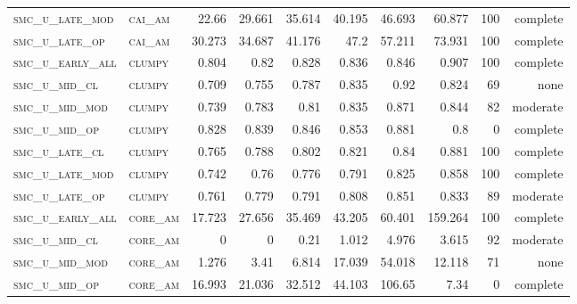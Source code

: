 \begin{landscape}
\begin{center}
\begin{footnotesize}
\begin{longtable}{llrrrrr|rrr}
\textsc{smc\_u\_late\_mod } & \textsc{cai\_am   }   & 22.66    & 29.661   & 35.614   & 40.195   & 46.693   & 60.877        & 100           & complete        \\
\textsc{smc\_u\_late\_op  } & \textsc{cai\_am   }   & 30.273   & 34.687   & 41.176   & 47.2     & 57.211   & 73.931        & 100           & complete        \\
\textsc{smc\_u\_early\_all} & \textsc{clumpy    }   & 0.804    & 0.82     & 0.828    & 0.836    & 0.846    & 0.907         & 100           & complete        \\
\textsc{smc\_u\_mid\_cl   } & \textsc{clumpy    }   & 0.709    & 0.755    & 0.787    & 0.835    & 0.92     & 0.824         & 69            & none        \\
\textsc{smc\_u\_mid\_mod  } & \textsc{clumpy    }   & 0.739    & 0.783    & 0.81     & 0.835    & 0.871    & 0.844         & 82            & moderate        \\
\textsc{smc\_u\_mid\_op   } & \textsc{clumpy    }   & 0.828    & 0.839    & 0.846    & 0.853    & 0.881    & 0.8           & 0             & complete            \\
\textsc{smc\_u\_late\_cl  } & \textsc{clumpy    }   & 0.765    & 0.788    & 0.802    & 0.821    & 0.84     & 0.881         & 100           & complete        \\
\textsc{smc\_u\_late\_mod } & \textsc{clumpy    }   & 0.742    & 0.76     & 0.776    & 0.791    & 0.825    & 0.858         & 100           & complete        \\
\textsc{smc\_u\_late\_op  } & \textsc{clumpy    }   & 0.761    & 0.779    & 0.791    & 0.808    & 0.851    & 0.833         & 89            & moderate        \\
\textsc{smc\_u\_early\_all} & \textsc{core\_am  }   & 17.723   & 27.656   & 35.469   & 43.205   & 60.401   & 159.264       & 100           & complete        \\
\textsc{smc\_u\_mid\_cl   } & \textsc{core\_am  }   & 0        & 0        & 0.21     & 1.012    & 4.976    & 3.615         & 92            & moderate        \\
\textsc{smc\_u\_mid\_mod  } & \textsc{core\_am  }   & 1.276    & 3.41     & 6.814    & 17.039   & 54.018   & 12.118        & 71            & none        \\
\textsc{smc\_u\_mid\_op   } & \textsc{core\_am  }   & 16.993   & 21.036   & 32.512   & 44.103   & 106.65   & 7.34          & 0             & complete            \\

\end{longtable}
\end{footnotesize}
\end{center}
\end{landscape}
